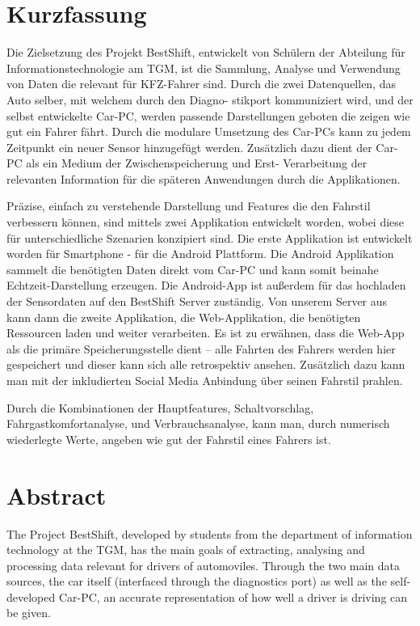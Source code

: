 \section*{Kurzfassung} 

Die Zielsetzung des Projekt BestShift, entwickelt von Schülern der Abteilung für Informationstechnologie am TGM, ist die Sammlung, Analyse und Verwendung von Daten die relevant für KFZ-Fahrer sind. Durch die zwei Datenquellen, das Auto selber, mit welchem durch den Diagno- stikport kommuniziert wird, und der selbst entwickelte Car-PC, werden passende Darstellungen geboten die zeigen wie gut ein Fahrer fährt. 
Durch die modulare Umsetzung des Car-PCs kann zu jedem Zeitpunkt ein neuer Sensor hinzugefügt werden. Zusätzlich dazu dient der Car-PC als ein Medium der Zwischenspeicherung und Erst- Verarbeitung der relevanten Information für die späteren Anwendungen durch die Applikationen. 

Präzise, einfach zu verstehende Darstellung und Features die den Fahrstil verbessern können, sind mittels zwei Applikation entwickelt worden, wobei diese für unterschiedliche Szenarien konzipiert sind. Die erste Applikation ist entwickelt worden für Smartphone - für die Android Plattform. Die Android Applikation sammelt die benötigten Daten direkt vom Car-PC und kann somit beinahe Echtzeit-Darstellung erzeugen. Die Android-App ist außerdem für das hochladen der Sensordaten auf den BestShift Server zuständig. Von unserem Server aus kann dann die zweite Applikation, die Web-Applikation, die benötigten Ressourcen laden und weiter verarbeiten. Es ist zu erwähnen, dass die Web-App als die primäre Speicherungsstelle dient – alle Fahrten des Fahrers werden hier gespeichert und dieser kann sich alle retrospektiv ansehen. Zusätzlich dazu kann man mit der inkludierten Social Media Anbindung über seinen Fahrstil prahlen. 

Durch die Kombinationen der Hauptfeatures, Schaltvorschlag, Fahrgastkomfortanalyse, und Verbrauchsanalyse, kann man, durch numerisch wiederlegte Werte, angeben wie gut der Fahrstil eines Fahrers ist.

\section*{Abstract} 

The Project BestShift, developed by students from the department of information technology at the TGM, has the main goals of extracting, analysing and processing data relevant for drivers of automoviles. Through the two main data sources, the car itself (interfaced through the diagnostics port) as well as the self-developed Car-PC, an accurate representation of how well a driver is driving can be given.

